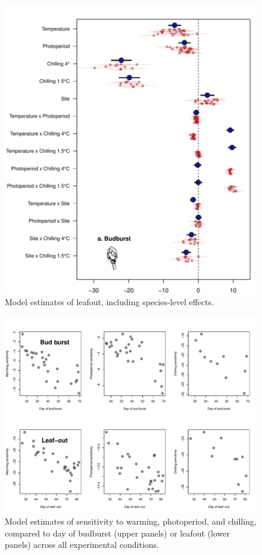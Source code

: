 \documentclass{article}
\begin{document}
\begin{figure}
\caption{Model estimates of leafout, including species-level effects.}
\label{figS3}
\includegraphics[scale=0.75, page=2]{Fig1_bb_lo+sp}
\end{figure}

\begin{figure}
\caption{Model estimates of sensitivity to warming, photoperiod, and chilling, compared to day of budburst (upper panels) or leafout (lower panels) across all experimental conditions.}
\label{figS4}
\includegraphics[scale=0.75]{Sens_vs_day}
\end{figure}
\end{document}
